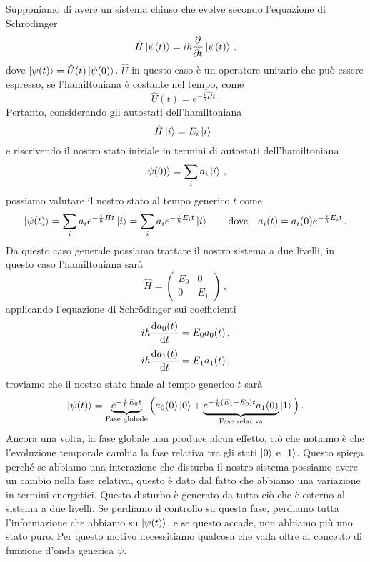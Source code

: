 Supponiamo di avere un sistema chiuso che evolve secondo l'equazione di Schrödinger
\begin{equation*}
    \hat H \ket{\psi(t)}=i\hbar \partialderivative{t}\ket{\psi(t)}\, ,
\end{equation*}
dove $\ket{\psi(t)}=\hat U(t)\ket{\psi(0)}$. $\hat U$ in questo caso è un operatore unitario che può essere espresso, se l'hamiltoniana è costante nel tempo, come
\begin{equation*}
    \hat U(t)=e^{-\frac{i}{\hbar}\hat H t}\, .
\end{equation*}
Pertanto, considerando gli autostati dell'hamiltoniana 
\begin{equation*}
    \hat H \ket{i}=E_i\ket{i}\, ,
\end{equation*}
e riscrivendo il nostro stato iniziale in termini di autostati dell'hamiltoniana
\begin{equation*}
    \ket{\psi(0)}=\sum_i a_i\ket i\, ,
\end{equation*}
possiamo valutare il nostro stato al tempo generico $t$ come
\begin{equation*}
    \ket{\psi(t)}=\sum_i a_ie^{-\frac i \hbar \hat H t}\ket i=\sum_i a_i e^{-\frac i \hbar E_i t}\ket i \qquad \text{dove} \quad a_i(t)=a_i(0)e^{-\frac i \hbar E_i t}\, .
\end{equation*}
Da questo caso generale possiamo trattare il nostro sistema a due livelli, in questo caso l'hamiltoniana sarà
\begin{equation*}
    \hat H = \begin{pmatrix}
        E_0 & 0 \\
        0 & E_1
       \end{pmatrix}\, ,
\end{equation*}
applicando l'equazione di Schrödinger sui coefficienti
\begin{equation*}
    i\hbar\derivative{a_0(t)}{t}=E_0a_0(t)\, ,
\end{equation*}
\begin{equation*}
    i\hbar\derivative{a_1(t)}{t}=E_1a_1(t)\, ,
\end{equation*}
troviamo che il nostro stato finale al tempo generico $t$ sarà
\begin{equation*}
    \ket{\psi(t)}=\underbrace{e^{-\frac{i}{\hbar}E_0t}}_{\text{Fase globale}}\Big(a_0(0)\ket 0 +\underbrace{e^{-\frac{i}{\hbar}(E_1-E_0)t}a_1(0)}_{\text{Fase relativa}}\ket 1\Big)\, .
\end{equation*}
Ancora una volta, la fase globale non produce alcun effetto, ciò che notiamo è che l'evoluzione temporale cambia la fase relativa tra gli stati $\ket 0$ e $\ket 1$. Questo spiega perché se abbiamo una interazione che disturba il nostro sistema possiamo avere un cambio nella fase relativa, questo è dato dal fatto che abbiamo una variazione in termini energetici. Questo disturbo è generato da tutto ciò che è esterno al sistema a due livelli. Se perdiamo il controllo su questa fase, perdiamo tutta l'informazione che abbiamo su $\ket{\psi(t)}$, e se questo accade, non abbiamo più uno stato puro. Per questo motivo necessitiamo qualcosa che vada oltre al concetto di funzione d'onda generica $\psi$.

